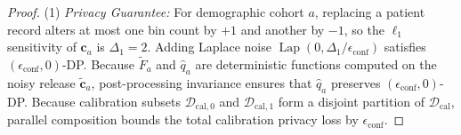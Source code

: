 \documentclass[pdflatex,sn-vancouver-num,referee,lineno]{sn-jnl}
\theoremstyle{thmstyleone}
\theoremstyle{thmstylethree}
\begin{document}
\begin{proof}
(1) \emph{Privacy Guarantee:} For demographic cohort $a$, replacing a patient record alters at most one bin count by $+1$ and another by $-1$, so the $\ell_1$ sensitivity of $\mathbf{c}_a$ is $\Delta_1 = 2$. Adding Laplace noise $\operatorname{Lap}(0, \Delta_1/\epsilon_{\text{conf}})$ satisfies $(\epsilon_{\text{conf}}, 0)$-DP. Because $\widetilde{F}_a$ and $\hat{q}_a$ are deterministic functions computed on the noisy release $\tilde{\mathbf{c}}_a$, post-processing invariance ensures that $\hat{q}_a$ preserves $(\epsilon_{\text{conf}}, 0)$-DP. Because calibration subsets $\mathcal{D}_{\text{cal}, 0}$ and $\mathcal{D}_{\text{cal}, 1}$ form a disjoint partition of $\mathcal{D}_{\text{cal}}$, parallel composition bounds the total calibration privacy loss by $\epsilon_{\text{conf}}$.


\end{proof}
\end{document}
